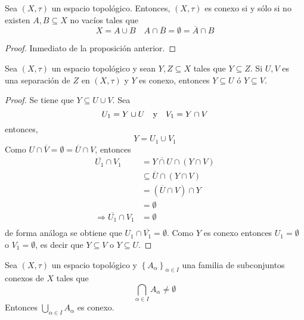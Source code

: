\documentclass[12pt]{report}
\theoremstyle{largebreak}
\newcommand{\Cls}[1]{\ensuremath{\overline{#1}}}
\begin{document}
    \begin{cor}
        Sea $(X,\tau)$ un espacio topológico. Entonces, $(X,\tau)$ es conexo si y sólo si no existen $A,B\subseteq X$ no vacíos tales que
        \begin{equation*}
            X=A\cup B\quad A\cap \Cls{B}=\emptyset=\Cls{A}\cap B
        \end{equation*}
    \end{cor}

    \begin{proof}
        Inmediato de la proposición anterior.
    \end{proof}

    \begin{propo}
        Sea $(X,\tau)$ un espacio topológico y sean $Y,Z\subseteq X$ tales que $Y\subseteq Z$. Si $U,V$ es una separación de $Z$ en $(X,\tau)$ y $Y$ es conexo, entonces $Y\subseteq U$ ó $Y\subseteq V$.
    \end{propo}

    \begin{proof}
        Se tiene que $Y\subseteq U\cup V$. Sea
        \begin{equation*}
            U_1=Y\cup U\quad\textup{y}\quad V_1=Y\cap V
        \end{equation*}
        entonces,
        \begin{equation*}
            Y=U_1\cup V_1
        \end{equation*}
        Como $U\cap\Cls{V}=\emptyset=\Cls{U}\cap V$, entonces
        \begin{equation*}
            \begin{split}
                \Cls{U_1}\cap V_1&=\Cls{Y\cap U}\cap (Y\cap V)\\
                &\subseteq\Cls{U}\cap (Y\cap V)\\
                &=(\Cls{U}\cap V)\cap Y\\
                &=\emptyset\\
                \Rightarrow \Cls{U_1}\cap V_1&=\emptyset\\
            \end{split}
        \end{equation*}
        de forma análoga se obtiene que $U_1\cap\Cls{V_1}=\emptyset$. Como $Y$ es conexo entonces $U_1=\emptyset$ o $V_1=\emptyset$, es decir que $Y\subseteq V$ o $Y\subseteq U$.
    \end{proof}

    \begin{propo}
        Sea $(X,\tau)$ un espacio topológico y $\left\{A_\alpha\right\}_{\alpha\in I}$ una familia de subconjuntos conexos de $X$ tales que
        \begin{equation*}
            \bigcap_{\alpha\in I}A_\alpha\neq\emptyset
        \end{equation*}
        Entonces $\bigcup_{\alpha\in I}A_\alpha$ es conexo.
    \end{propo}
\end{document}

